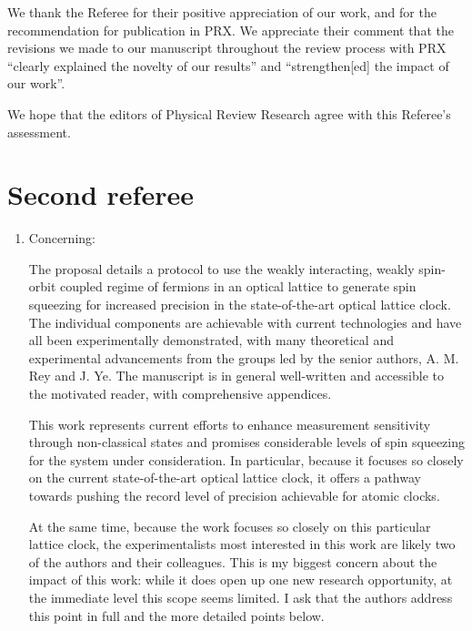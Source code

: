 \documentclass[preprint,superscriptaddress]{revtex4-2}
\newcommand{\blue}[1]{{\color{blue} #1}}
\begin{document}
We thank the Referee for their positive appreciation of our work, and for the recommendation for publication in PRX.
We appreciate their comment that the revisions we made to our manuscript throughout the review process with PRX ``clearly explained the novelty of our results'' and ``strengthen[ed] the impact of our work''.

We hope that the editors of Physical Review Research agree with this Referee's assessment.

\section{Second referee}
\label{sec:R2}

\begin{enumerate}
\item Concerning:
  \label{pt:R2.scope}

  \blue{The proposal details a protocol to use the weakly interacting,
    weakly spin-orbit coupled regime of fermions in an optical lattice
    to generate spin squeezing for increased precision in the
    state-of-the-art optical lattice clock.  The individual components
    are achievable with current technologies and have all been
    experimentally demonstrated, with many theoretical and
    experimental advancements from the groups led by the senior
    authors, A. M. Rey and J. Ye. The manuscript is in general
    well-written and accessible to the motivated reader, with
    comprehensive appendices.}

  \blue{This work represents current efforts to enhance measurement
    sensitivity through non-classical states and promises considerable
    levels of spin squeezing for the system under consideration. In
    particular, because it focuses so closely on the current
    state-of-the-art optical lattice clock, it offers a pathway
    towards pushing the record level of precision achievable for
    atomic clocks.}

  \blue{At the same time, because the work focuses so closely on this
    particular lattice clock, the experimentalists most interested in
    this work are likely two of the authors and their colleagues. This
    is my biggest concern about the impact of this work: while it does
    open up one new research opportunity, at the immediate level this
    scope seems limited. I ask that the authors address this point in
    full and the more detailed points below.}


\end{enumerate}
\end{document}
